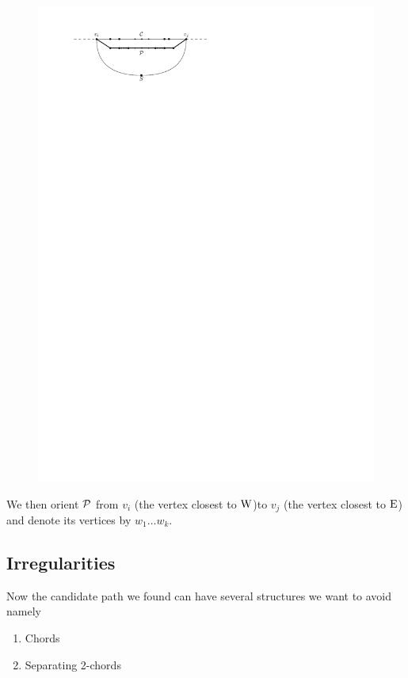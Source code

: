     \begin{figure}[h]
      \centering
      \includegraphics[scale=1]{unifiedAlgo/img/sweep/rightNeighbourWalk}
      \caption{}
      \label{fig:sweep:rightNeighbourwalk}
    \end{figure}

    We then orient $\P$ from $v_i$ (the vertex closest to $\pW$)to $v_j$ (the vertex closest to $\pE$) and denote its vertices by $w_1 \ldots w_k$.

  \subsection{Irregularities}
    Now the candidate path we found can have several structures we want to avoid
    namely
    \begin{enumerate}
      \itemsep=-4pt
      \item Chords
      \item Separating 2-chords
    \end{enumerate}

